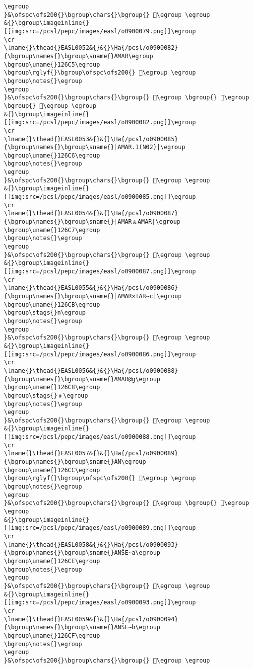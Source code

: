 \begin{verbatim}
\egroup
}&\ofspc\ofs200{}\bgroup\chars{}\bgroup{} 𒛄\egroup \egroup
&{}\bgroup\imageinline{}[[img:src=/pcsl/pepc/images/easl/o0900079.png]]\egroup
\cr
\lname{}\thead{}EASL0052&{}&{}\Ha{/pcsl/o0900082}{\bgroup\names{}\bgroup\sname{}AMAR\egroup
\bgroup\uname{}126C5\egroup
\bgroup\rglyf{}\bgroup\ofspc\ofs200{} 𒛅\egroup \egroup
\bgroup\notes{}\egroup
\egroup
}&\ofspc\ofs200{}\bgroup\chars{}\bgroup{} 𒛊\egroup \bgroup{} 𒛅\egroup \bgroup{} 𒛉\egroup \egroup
&{}\bgroup\imageinline{}[[img:src=/pcsl/pepc/images/easl/o0900082.png]]\egroup
\cr
\lname{}\thead{}EASL0053&{}&{}\Ha{/pcsl/o0900085}{\bgroup\names{}\bgroup\sname{}|AMAR.1(N02)|\egroup
\bgroup\uname{}126C6\egroup
\bgroup\notes{}\egroup
\egroup
}&\ofspc\ofs200{}\bgroup\chars{}\bgroup{} 𒛆\egroup \egroup
&{}\bgroup\imageinline{}[[img:src=/pcsl/pepc/images/easl/o0900085.png]]\egroup
\cr
\lname{}\thead{}EASL0054&{}&{}\Ha{/pcsl/o0900087}{\bgroup\names{}\bgroup\sname{}|AMAR﹠AMAR|\egroup
\bgroup\uname{}126C7\egroup
\bgroup\notes{}\egroup
\egroup
}&\ofspc\ofs200{}\bgroup\chars{}\bgroup{} 𒛇\egroup \egroup
&{}\bgroup\imageinline{}[[img:src=/pcsl/pepc/images/easl/o0900087.png]]\egroup
\cr
\lname{}\thead{}EASL0055&{}&{}\Ha{/pcsl/o0900086}{\bgroup\names{}\bgroup\sname{}|AMAR×TAR∼c|\egroup
\bgroup\uname{}126CB\egroup
\bgroup\stags{}n\egroup
\bgroup\notes{}\egroup
\egroup
}&\ofspc\ofs200{}\bgroup\chars{}\bgroup{} 𒛋\egroup \egroup
&{}\bgroup\imageinline{}[[img:src=/pcsl/pepc/images/easl/o0900086.png]]\egroup
\cr
\lname{}\thead{}EASL0056&{}&{}\Ha{/pcsl/o0900088}{\bgroup\names{}\bgroup\sname{}AMAR@g\egroup
\bgroup\uname{}126C8\egroup
\bgroup\stags{}﹟\egroup
\bgroup\notes{}\egroup
\egroup
}&\ofspc\ofs200{}\bgroup\chars{}\bgroup{} 𒛈\egroup \egroup
&{}\bgroup\imageinline{}[[img:src=/pcsl/pepc/images/easl/o0900088.png]]\egroup
\cr
\lname{}\thead{}EASL0057&{}&{}\Ha{/pcsl/o0900089}{\bgroup\names{}\bgroup\sname{}AN\egroup
\bgroup\uname{}126CC\egroup
\bgroup\rglyf{}\bgroup\ofspc\ofs200{} 𒛌\egroup \egroup
\bgroup\notes{}\egroup
\egroup
}&\ofspc\ofs200{}\bgroup\chars{}\bgroup{} 𒛍\egroup \bgroup{} 𒛌\egroup \egroup
&{}\bgroup\imageinline{}[[img:src=/pcsl/pepc/images/easl/o0900089.png]]\egroup
\cr
\lname{}\thead{}EASL0058&{}&{}\Ha{/pcsl/o0900093}{\bgroup\names{}\bgroup\sname{}ANŠE∼a\egroup
\bgroup\uname{}126CE\egroup
\bgroup\notes{}\egroup
\egroup
}&\ofspc\ofs200{}\bgroup\chars{}\bgroup{} 𒛎\egroup \egroup
&{}\bgroup\imageinline{}[[img:src=/pcsl/pepc/images/easl/o0900093.png]]\egroup
\cr
\lname{}\thead{}EASL0059&{}&{}\Ha{/pcsl/o0900094}{\bgroup\names{}\bgroup\sname{}ANŠE∼b\egroup
\bgroup\uname{}126CF\egroup
\bgroup\notes{}\egroup
\egroup
}&\ofspc\ofs200{}\bgroup\chars{}\bgroup{} 𒛏\egroup \egroup

\end{verbatim}
